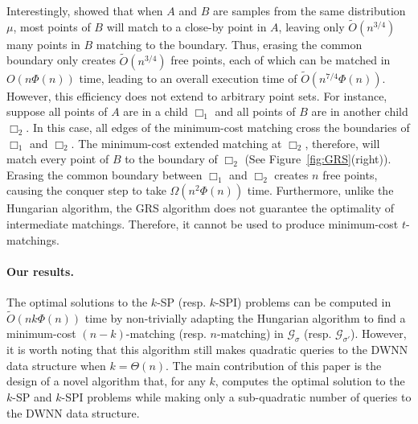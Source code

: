 \documentclass[11pt,onecolumn]{article}
\def\mcG{{\mathcal{G}}}
\newcommand{\cell}{\Box}
\newcommand{\requests}{\sigma}
\newcommand\myparagraph[1]{\paragraph{#1}}
\begin{document}
Interestingly, \citet{gattani2023robust} showed that when $A$ and $B$ are samples from the same distribution $\mu$, most points of $B$ will match to a close-by point in $A$, leaving only $\tilde{O}(n^{3/4})$ many points in $B$ matching to the boundary. Thus, erasing the common boundary only creates $\tilde{O}(n^{3/4})$ free points, each of which can be matched in $O(n\Phi(n))$ time, leading to an overall execution time of $\tilde{O}(n^{7/4}\Phi(n))$. However, this efficiency does not extend to arbitrary point sets. For instance, suppose all points of $A$ are in a child $\cell_1$ and all points of $B$ are in another child $\cell_2$. In this case, all edges of the minimum-cost matching cross the boundaries of $\cell_1$ and $\cell_2$. The minimum-cost extended matching at $\cell_2$, therefore, will match every point of $B$ to the boundary of $\cell_2$ (See Figure~\ref{fig:GRS}(right)). Erasing the common boundary between $\cell_1$ and $\cell_2$ creates $n$ free points, causing the conquer step to take $\Omega(n^2\Phi(n))$ time. Furthermore, unlike the Hungarian algorithm, the GRS algorithm does not guarantee the optimality of intermediate matchings. Therefore, it cannot be used to produce minimum-cost $t$-matchings. 


%

%




%


%
%

%
%
%
%
%
%
%
%
%
%
%
%

 
%






%

%


%


%
 
%
 

%
%

%
%
%
%



%
%
%
%
%
%
%


%



%


%


  
 

%


\myparagraph{Our results.} 
The optimal solutions to the $k$-SP (resp. $k$-SPI) problems can be computed in $\tilde{O}(nk\Phi(n))$ time by non-trivially adapting the Hungarian algorithm to find a minimum-cost $(n-k)$-matching (resp. $n$-matching) in $\mcG_{\requests}$ (resp. $\mcG_{\requests'}$). 
%
However, it is worth noting that this algorithm still makes quadratic queries to the DWNN data structure when $k = \Theta(n)$. The main contribution of this paper is the design of a novel algorithm that, for any $k$, computes the optimal solution to the $k$-SP and $k$-SPI problems while making only a sub-quadratic number of queries to the DWNN data structure. 
\end{document}

